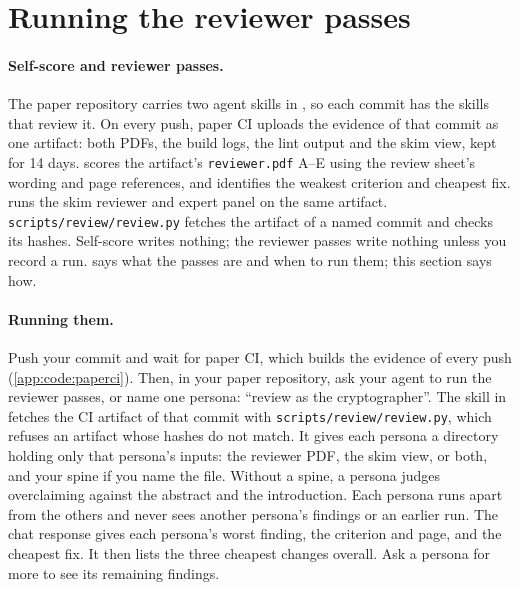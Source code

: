
\section{Running the reviewer passes}\label{app:code:reviewers}
\paragraph{Self-score and reviewer passes.} The paper repository carries two agent skills in , so each commit has the skills that review it. On every push, paper CI uploads the evidence of that commit as one artifact: both PDFs, the build logs, the lint output and the skim view, kept for 14 days.  scores the artifact's \texttt{reviewer.pdf} A--E using the review sheet's wording and page references, and identifies the weakest criterion and cheapest fix.  runs the skim reviewer and expert panel on the same artifact. \texttt{scripts/review/review.py} fetches the artifact of a named commit and checks its hashes. Self-score writes nothing; the reviewer passes write nothing unless you record a run.  says what the passes are and when to run them; this section says how.

\paragraph{Running them.} Push your commit and wait for paper CI, which builds the evidence of every push (\cref{app:code:paperci}). Then, in your paper repository, ask your agent to run the reviewer passes, or name one persona: \enquote{review as the cryptographer}. The skill in  fetches the CI artifact of that commit with \texttt{scripts/review/review.py}, which refuses an artifact whose hashes do not match. It gives each persona a directory holding only that persona's inputs: the reviewer PDF, the skim view, or both, and your spine if you name the file. Without a spine, a persona judges overclaiming against the abstract and the introduction. Each persona runs apart from the others and never sees another persona's findings or an earlier run. The chat response gives each persona's worst finding, the criterion and page, and the cheapest fix. It then lists the three cheapest changes overall. Ask a persona for more to see its remaining findings.


